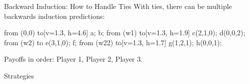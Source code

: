 


\begin{frame}{Backward Induction: How to Handle Ties}
With ties, there can be multiple backwards induction predictions:
\bsk
\centering
\begin{gametree}[labels=short, scale=0.9]
  \branch[player=1, root=w, label=90] from (0,0) to[v=1.3, h=4.6] {a; b};
  \branch[player=2, label=135] from (w1) to[v=1.3, h=1.9] {c(2,1,0); d(0,0,2)};
  \branch[label=45] from (w2) to {e(3,1,0); f};
  \branch[player=3, label=45] from (w22) to[v=1.3, h=1.7] {g(1,2,1); h(0,0,1)};
\end{gametree}
\bsk
\raggedright
{\footnotesize Payoffs in order: Player 1, Player 2, Player 3.}
\vspace{-0.2in}
\end{frame}



\begin{frame}[standout]
Strategies
\end{frame}

